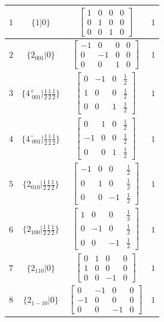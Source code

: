 \documentclass[fleqn,8pt]{jsarticle}
\begin{document}
\begin{longtable}{cccc}
$ 1 $ & $ \{1|0\} $ & $ \begin{bmatrix} 1 & 0 & 0 & 0 \\ 0 & 1 & 0 & 0 \\ 0 & 0 & 1 & 0 \end{bmatrix} $ & $ 1 $ \\ \hline
$ 2 $ & $ \{2{}_{001}|0\} $ & $ \begin{bmatrix} -1 & 0 & 0 & 0 \\ 0 & -1 & 0 & 0 \\ 0 & 0 & 1 & 0 \end{bmatrix} $ & $ 1 $ \\ \hline
$ 3 $ & $ \{4^{+}_{\,\,001}|\frac{1}{2} \frac{1}{2} \frac{1}{2}\} $ & $ \begin{bmatrix} 0 & -1 & 0 & \frac{1}{2} \\ 1 & 0 & 0 & \frac{1}{2} \\ 0 & 0 & 1 & \frac{1}{2} \end{bmatrix} $ & $ 1 $ \\ \hline
$ 4 $ & $ \{4^{-}_{\,\,001}|\frac{1}{2} \frac{1}{2} \frac{1}{2}\} $ & $ \begin{bmatrix} 0 & 1 & 0 & \frac{1}{2} \\ -1 & 0 & 0 & \frac{1}{2} \\ 0 & 0 & 1 & \frac{1}{2} \end{bmatrix} $ & $ 1 $ \\ \hline
$ 5 $ & $ \{2{}_{010}|\frac{1}{2} \frac{1}{2} \frac{1}{2}\} $ & $ \begin{bmatrix} -1 & 0 & 0 & \frac{1}{2} \\ 0 & 1 & 0 & \frac{1}{2} \\ 0 & 0 & -1 & \frac{1}{2} \end{bmatrix} $ & $ 1 $ \\ \hline
$ 6 $ & $ \{2{}_{100}|\frac{1}{2} \frac{1}{2} \frac{1}{2}\} $ & $ \begin{bmatrix} 1 & 0 & 0 & \frac{1}{2} \\ 0 & -1 & 0 & \frac{1}{2} \\ 0 & 0 & -1 & \frac{1}{2} \end{bmatrix} $ & $ 1 $ \\ \hline
$ 7 $ & $ \{2{}_{110}|0\} $ & $ \begin{bmatrix} 0 & 1 & 0 & 0 \\ 1 & 0 & 0 & 0 \\ 0 & 0 & -1 & 0 \end{bmatrix} $ & $ 1 $ \\ \hline
$ 8 $ & $ \{2{}_{1-10}|0\} $ & $ \begin{bmatrix} 0 & -1 & 0 & 0 \\ -1 & 0 & 0 & 0 \\ 0 & 0 & -1 & 0 \end{bmatrix} $ & $ 1 $ \\ \hline

\end{longtable}
\end{document}
